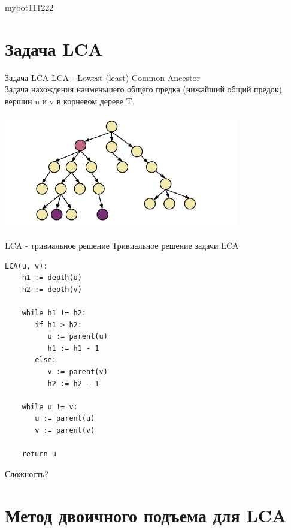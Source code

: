 mybot111222\documentclass[10pt]{beamer}
\begin{document}
\section{Задача LCA}

\begin{frame}[fragile]{Задача LCA}
LCA - Lowest (least) Common Ancestor \\ Задача нахождения наименьшего общего предка (нижайший общий предок) вершин u и v в корневом дереве T.\\

\begin{center}
    \includegraphics[height=5cm]{Term_2/Source/images/10-Finding-the-Lowest-Common-Ancestor.png}
\end{center}

\end{frame}


\begin{frame}[fragile]{LCA - тривиальное решение}
Тривиальное решение задачи LCA
\begin{lstlisting}
LCA(u, v):
    h1 := depth(u)
    h2 := depth(v)
  
    while h1 != h2:
       if h1 > h2:
          u := parent(u)
          h1 := h1 - 1
       else:
          v := parent(v)
          h2 := h2 - 1
  
    while u != v:
       u := parent(u)
       v := parent(v)
  
    return u
\end{lstlisting}
Сложность?
\end{frame}



\section{Метод двоичного подъема для LCA}
\end{document}
